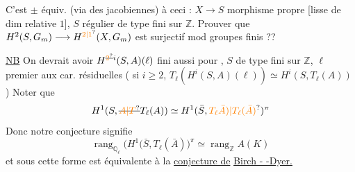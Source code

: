 
C'est  $\pm$ équiv. (via des jacobiennes) à %
ceci : $X\longrightarrow S$ morphisme propre [lisse %
de dim relative $1$], $S$ régulier de %
type fini sur $\mathbb{Z}$. Prouver que %
$H^2(S,G_m)\longrightarrow H^{\unsure{2|1}}(X,G_m)$ est surjectif mod %
groupes finis ?? %

\uline{NB} On devrait avoir $H^{\deleted{\unsure{2}}i}(S,A)(\ell)$ fini aussi %
pour , $S$ de type fini sur $\mathbb{Z}$, $\ell$ premier aux %
car. résiduelles  ( si $i\ge2$, $T_\ell(H^i(S,A)(\ell))\simeq H^i(S,T_\ell(A))$) %
Noter que %
\[
H^1(S,\deleted{\unsure{A|T}}T_\ell(A))\simeq H^1(\bar S,\unsure{T_\ell\bar A)|T_\ell(\bar A)})^\pi %
\]
Donc notre conjecture signifie  %
\[
\operatorname{rang}_{\mathbb{Q}_\ell}\bigl(H^1(\bar S,T_\ell(\bar A)\bigr)^\pi
 \simeq \operatorname{rang}_{\mathbb{Z}} A(K) %
\]
et sous cette forme est  %
équivalente à la \uline{conjecture de} %
 \uline{Birch - -Dyer.} %
